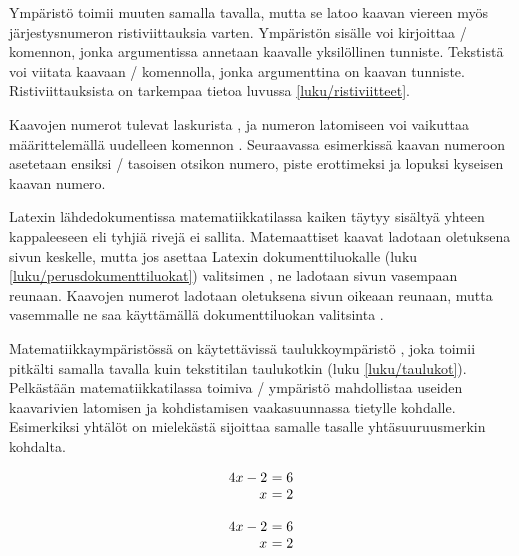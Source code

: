 \noindent
Ympäristö  toimii muuten samalla tavalla, mutta se
latoo kaavan viereen myös järjestysnumeron ristiviittauksia varten.
Ympäristön sisälle voi kirjoittaa \-/ komennon, jonka
argumentissa annetaan kaavalle yksilöllinen tunniste. Tekstistä voi
viitata kaavaan \-/ komennolla, jonka argumenttina on
kaavan tunniste. Ristiviittauksista on tarkempaa tietoa luvussa
\ref{luku/ristiviitteet}.

Kaavojen numerot tulevat laskurista , ja numeron
latomiseen voi vaikuttaa määrittelemällä uudelleen komennon
. Seuraavassa esimerkissä kaavan numeroon asetetaan
ensiksi \-/ tasoisen otsikon numero, piste erottimeksi
ja lopuksi kyseisen kaavan numero.

\begin{koodilohkosis}
\renewcommand{\theequation}{\thesection.\arabic{equation}}
\end{koodilohkosis}

\noindent
Latexin lähdedokumentissa matematiikkatilassa kaiken täytyy sisältyä
yhteen kappaleeseen eli tyhjiä rivejä ei sallita. Matemaattiset kaavat
ladotaan oletuksena sivun keskelle, mutta jos asettaa Latexin
dokumenttiluokalle (luku \ref{luku/perusdokumenttiluokat}) valitsimen
, ne ladotaan sivun vasempaan reunaan. Kaavojen numerot
ladotaan oletuksena sivun oikeaan reunaan, mutta vasemmalle ne saa
käyttämällä dokumenttiluokan valitsinta .

Matematiikkaympäristössä on käytettävissä taulukkoympäristö
, joka toimii pitkälti samalla tavalla kuin
tekstitilan taulukotkin (luku \ref{luku/taulukot}). Pelkästään
matematiikkatilassa toimiva \-/ ympäristö mahdollistaa
useiden kaavarivien latomisen ja kohdistamisen vaakasuunnassa tietylle
kohdalle. Esimerkiksi yhtälöt on mielekästä sijoittaa samalle tasalle
yhtäsuuruusmerkin kohdalta.

\begin{koodilohkosis}
\[ \begin{array}{r@{~}l}
     4x - 2 &= 6 \\
     x      &= 2 \\
   \end{array} \]
\end{koodilohkosis}
\[ \begin{array}{r@{~}l}
     4x - 2 &= 6 \\
     x      &= 2 \\
   \end{array} \]


